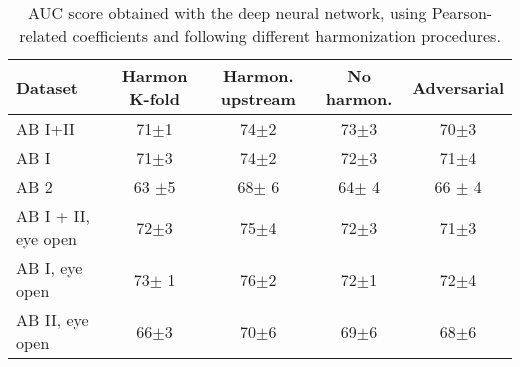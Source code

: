 \documentclass[11pt]{report}
\begin{document}

\begin{table}[!htp]\centering
\scriptsize
\begin{tabular}{lcccc}\toprule
Dataset &Harmon K-fold &Harmon. upstream &No harmon. &Adversarial \\\midrule
AB I+II &71$\pm$1 &74$\pm$2 &73$\pm$3 &70$\pm$3 \\
AB I &71$\pm$3 &74$\pm$2 &72$\pm$3 &71$\pm$4 \\
AB 2 &63 $\pm$5 &68$\pm$ 6 &64$\pm$ 4 &66 $\pm$ 4 \\
AB I + II, eye open &72$\pm$3 &75$\pm$4 &72$\pm$3 &71$\pm$3 \\
AB I, eye open &73$\pm$ 1 &76$\pm$2 &72$\pm$1 &72$\pm$4 \\
AB II, eye open &66$\pm$3 &70$\pm$6 &69$\pm$6 &68$\pm$6 \\
\bottomrule
\end{tabular}
\caption{AUC score obtained with the deep neural network, using Pearson-related coefficients and following different harmonization procedures.}
\label{tab:classification_pearson}
\end{table}
\end{document}
